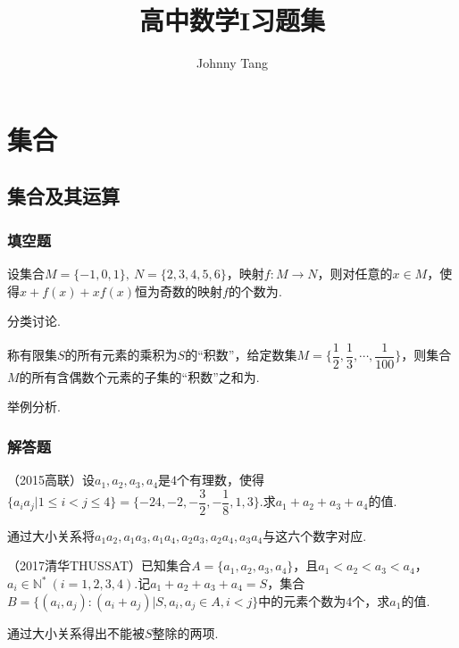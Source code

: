 \documentclass[cn,hazy,black,10pt,normal]{elegantnote}
\title{高中数学I习题集}
\author{Johnny Tang}
\institute{DEEP Team}
\date{\zhtoday}
\newcommand{\tk}{\uline{\hspace{4em}}}
\begin{document}
\maketitle

\chapter{集合}

\section{集合及其运算}

\subsection*{填空题}

\begin{problem} %
	设集合$M=\{ -1,0,1 \} , ~N=\{ 2,3,4,5,6 \}$，映射$f:M \to N$，则对任意的$x \in M$，使得$x + f(x) +xf(x)$恒为奇数的映射$f$的个数为\tk .
\end{problem}
\begin{hint}
	分类讨论.
\end{hint}

\begin{problem}
	称有限集$S$的所有元素的乘积为$S$的“积数”，给定数集$M= \{ \dfrac{1}{2},\dfrac{1}{3}, \cdots ,\dfrac{1}{100} \}$，则集合$M$的所有含偶数个元素的子集的“积数”之和为\tk .
\end{problem}
\begin{hint}
	举例分析.
\end{hint}

\subsection*{解答题}

\begin{problem} %
	（2015高联）设$a_1,a_2,a_3,a_4$是$4$个有理数，使得$\{ a_ia_j | 1 \leq i < j \leq 4 \} = \{ -24,-2,-\dfrac{3}{2},-\dfrac{1}{8},1,3 \}$.求$a_1+a_2+a_3+a_4$的值.
\end{problem}
\begin{hint}
	通过大小关系将$a_1a_2,a_1a_3,a_1a_4,a_2a_3,a_2a_4,a_3a_4$与这六个数字对应.
\end{hint}

\begin{problem} %
	（2017清华THUSSAT）已知集合$A= \{ a_1,a_2,a_3,a_4 \}$，且$a_1 < a_2 < a_3 < a_4$，$a_i \in \mathbb{N} ^* ~(i=1,2,3,4)$.记$a_1+a_2+a_3+a_4=S$，集合$B = \{ (a_i,a_j) : (a_i+a_j) | S, a_i,a_j \in A, i<j \}$中的元素个数为$4$个，求$a_1$的值.
\end{problem}
\begin{hint}
	通过大小关系得出不能被$S$整除的两项.
\end{hint}
\end{document}
